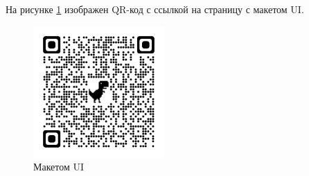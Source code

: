 
На рисунке \ref{fig:qrcode_figma} изображен QR-код с ссылкой на страницу с макетом UI.

\begin{figure}
    \includegraphics[width=5cm]{inc/qrcode_www.figma.com.png}
    \caption{Макетом UI}
    \label{fig:qrcode_figma}
\end{figure}
